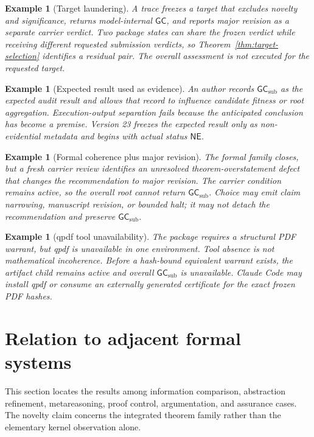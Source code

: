 \documentclass[10pt]{article}
\newtheorem{example}[definition]{Example}
\newcommand{\GC}{\mathsf{GC}}
\newcommand{\NE}{\mathsf{NE}}
\newcommand{\GCsub}{\mathsf{GC}_{\mathrm{sub}}}
\begin{document}
\begin{example}[Target laundering]
A trace freezes a target that excludes novelty and significance, returns model-internal $\GC$, and reports major revision as a separate carrier verdict.  Two package states can share the frozen verdict while receiving different requested submission verdicts, so Theorem~\ref{thm:target-selection} identifies a residual pair.  The overall assessment is not executed for the requested target.
\end{example}

\begin{example}[Expected result used as evidence]
An author records $\GCsub$ as the expected audit result and allows that record to influence candidate fitness or root aggregation.  Execution-output separation fails because the anticipated conclusion has become a premise.  Version 23 freezes the expected result only as non-evidential metadata and begins with actual status $\NE$.
\end{example}

\begin{example}[Formal coherence plus major revision]
The formal family closes, but a fresh carrier review identifies an unresolved theorem-overstatement defect that changes the recommendation to major revision.  The carrier condition remains active, so the overall root cannot return $\GCsub$.  Choice may emit claim narrowing, manuscript revision, or bounded halt; it may not detach the recommendation and preserve $\GCsub$.
\end{example}

\begin{example}[qpdf tool unavailability]
The package requires a structural PDF warrant, but qpdf is unavailable in one environment.  Tool absence is not mathematical incoherence.  Before a hash-bound equivalent warrant exists, the artifact child remains active and overall $\GCsub$ is unavailable.  Claude Code may install qpdf or consume an externally generated certificate for the exact frozen PDF hashes.
\end{example}



\section{Relation to adjacent formal systems}

This section locates the results among information comparison, abstraction refinement, metareasoning, proof control, argumentation, and assurance cases.  The novelty claim concerns the integrated theorem family rather than the elementary kernel observation alone.
\end{document}
